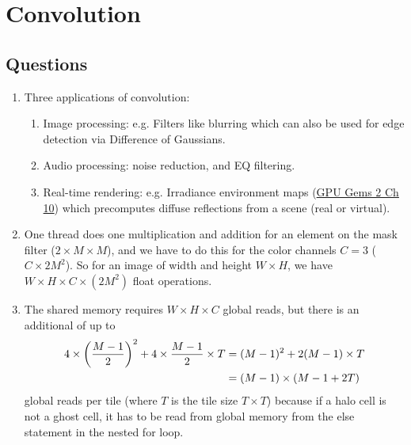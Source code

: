 \documentclass[../main.tex]{subfiles}
\begin{document}
\pagestyle{fancy}


\renewcommand{\thefigure}{\arabic{figure}}
\section*{Convolution}

\subsection*{Questions}

\begin{enumerate}
    \item Three applications of convolution:
    \begin{enumerate}
        \item Image processing: e.g. Filters like blurring which can also be used for edge
        detection via Difference of Gaussians.
        \item Audio processing: noise reduction, and EQ filtering.
        \item Real-time rendering: e.g. Irradiance environment maps (\href{https://developer.nvidia.com/gpugems/gpugems2/part-ii-shading-lighting-and-shadows/chapter-10-real-time-computation-dynamic}{GPU Gems 2 Ch 10})
        which precomputes diffuse reflections from a scene (real or virtual).
    \end{enumerate}

    \item One thread does one multiplication and addition for an element on the mask filter
    ($2 \times M \times M$), and we have to do this for the color channels $C = 3$
    ($C\times 2 M^2$).
    So for an image of width and height $W \times H$,
    we have $W \times H \times C \times (2M^2)$ float operations.

    \item The shared memory requires $W \times H \times C$ global reads, but there is an additional
    of up to
    \begin{align*}
        4 \times \qt(\frac{M - 1}{2})^2 + 4 \times \frac{M - 1}{2} \times T
        &= (M - 1)^2 + 2 (M - 1) \times T \\
        &= (M - 1) \times \qt(M - 1 + 2T)
    \end{align*}
    global reads per tile (where $T$ is the tile size $T \times T$) because if a halo cell is not
    a ghost cell, it has to be read from global memory from the else statement in the nested for
    loop. 


\end{enumerate}
\end{document}
